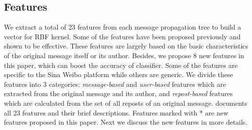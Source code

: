 \subsection{Features}
\label{sec:feature}
We extract a total of 23 features from each message propagation tree
to build a vector for RBF kernel. Some of the features have been proposed
previously \cite{yang2012automatic,castillo2011information,qazvinian2011rumor}
and shown to be effective. These features are largely based on the basic
characteristics of the original message itself or its author.
Besides, we propose 8 new features in this paper, which can
boost the accuracy of classifier.
Some of the features are specific to the Sina Weibo platform while
others are generic. We divide these features into 3 categories:
{\em message-based} and {\em user-based} features
which are extracted from the original message and its author,
and {\em repost-based} features which are calculated from the set of all
reposts of an original message.
 documents all 23 features and their brief
descriptions. Features marked with * are new features proposed in this paper.
Next we discuss the new features in more details.
